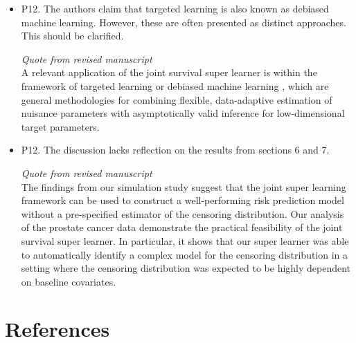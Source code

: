 \documentclass[a4paper,danish]{article}
\newcommand{\1}{\mathds{1}}
\newcommand{\qrev}[2]{
\vspace{.5em}
\begin{tcolorbox}[boxrule=0pt]
\hfill{\it\footnotesize Quote from revised manuscript#1}\\[.5em]
#2
\end{tcolorbox}
}
\newcommand{\answer}[1]{{\vspace{1em}{\bf #1}\vspace{1em}}}
\begin{document}
\begin{itemize}
\item P12. The authors claim that targeted learning is also known as
debiased machine learning.  However, these are often presented as
distinct approaches. This should be clarified.

\answer{This is a fair point. We have updated the text and replaced "known as" with "or" as follows:}

\qrev{}{ A relevant application of the joint survival super learner is
    within the framework of targeted learning \citep{van2011targeted} or
    debiased machine learning \citep{chernozhukov2018double}, which are
    general methodologies for combining flexible, data-adaptive
    estimation of nuisance parameters with asymptotically valid
    inference for low-dimensional target parameters.  }
\end{itemize}


\begin{itemize}
\item P12. The discussion lacks reflection on the results from sections 6
and 7.

  \answer{We have added the following paragraph at the very end of the discussion.}
  \qrev{}{
The findings from our simulation study suggest that the joint super
learning framework can be used to construct a well-performing
risk prediction model without a pre-specified estimator of the
censoring distribution. Our analysis of the prostate cancer data
demonstrate the practical feasibility of the joint survival super
learner. In particular, it shows that our super learner was able to
automatically identify a complex model for the censoring distribution
in a setting where the censoring distribution was expected to be
highly dependent on baseline covariates. 
  }
\end{itemize}




\section*{References}
\label{sec:org4e2456f}
\renewcommand{\section}[2]{} 

\end{document}
